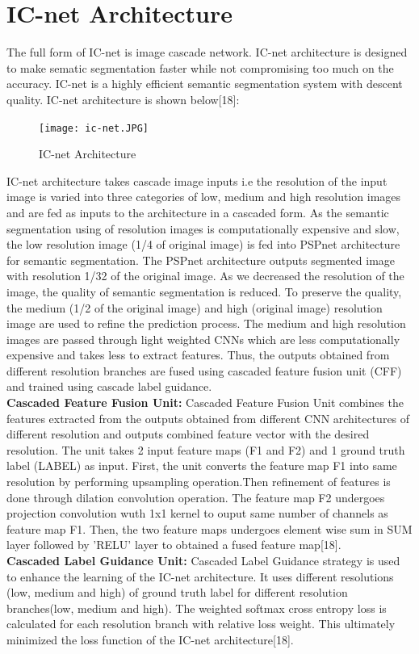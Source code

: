 \documentclass{IEEEtran}
\begin{document}
\section{\textbf{IC-net Architecture}}
The full form of IC-net is image cascade network. IC-net architecture is designed to make sematic segmentation faster while not compromising too much on the accuracy. IC-net is a highly efficient semantic segmentation system with descent quality. IC-net architecture is shown below[18]:

\begin{figure}[h]
    \centering
    \captionsetup{justification=centering}
    \texttt{[image: ic-net.JPG]}
    \caption{IC-net Architecture}
    \label{fig:Binary class segmented output}
\end{figure}

IC-net architecture takes cascade image inputs i.e the resolution of the input image is varied into three categories of low, medium and high resolution images and are fed as inputs to the architecture in a cascaded form. As the semantic segmentation using of resolution images is computationally expensive and slow, the low resolution image (1/4 of original image) is fed into PSPnet architecture for semantic segmentation. The PSPnet architecture outputs segmented image with resolution 1/32 of the original image. As we decreased the resolution of the image, the quality of semantic segmentation is reduced. To preserve the quality, the medium (1/2 of the original image) and high (original image) resolution image are used to refine the prediction process. The medium and high resolution images are passed through light weighted CNNs which are less computationally expensive and takes less to extract features. Thus, the outputs obtained from different resolution branches are fused using cascaded feature fusion unit (CFF) and trained using cascade label guidance.
\newline
\\
\textbf{Cascaded Feature Fusion Unit:}
Cascaded Feature Fusion Unit combines the features extracted from the outputs obtained from different CNN architectures of different resolution and outputs combined feature vector with the desired resolution. The unit takes 2 input feature maps (F1 and F2) and 1 ground truth label (LABEL) as input. First, the unit converts the feature map F1 into same resolution by performing upsampling operation.Then refinement of features is done through dilation convolution operation. The feature map F2 undergoes projection convolution wuth 1x1 kernel to ouput same number of channels as feature map F1. Then, the two feature maps undergoes element wise sum in SUM layer followed by 'RELU' layer to obtained a fused feature map[18]. 
\newline
\\
\textbf{Cascaded Label Guidance Unit:}
Cascaded Label Guidance strategy is used to enhance the learning of the IC-net architecture. It uses different resolutions (low, medium and high) of ground truth label for different resolution branches(low, medium and high). The weighted softmax cross entropy loss is calculated for each resolution branch with relative loss weight. This ultimately minimized the loss function of the IC-net architecture[18].
\end{document}
